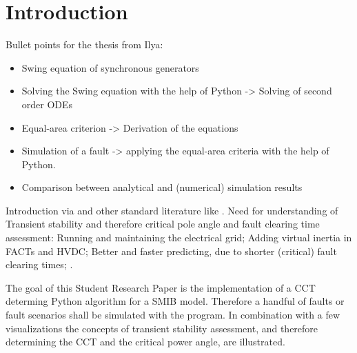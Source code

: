 
\chapter{Introduction}
\label{chap:intro}

Bullet points for the thesis from Ilya:
\begin{itemize}
    \item Swing equation of synchronous generators
    \item Solving the Swing equation with the help of Python -> Solving of second order ODEs
    \item Equal-area criterion -> Derivation of the equations
    \item Simulation of a fault -> applying the equal-area criteria with the help of Python.
    \item Comparison between analytical and (numerical) simulation results
\end{itemize}

Introduction via \autocite{vdeverbandderelektrotechnikelektronikinformationstechnike.v.PerspektivenElektrischenEnergieubertragung2019} and other standard literature like \autocite{gloverPowerSystemAnalysis2017,kundurPowerSystemStability2022,machowskiPowerSystemDynamics2020,oedingElektrischeKraftwerkeUnd2016,schwabElektroenergiesystemeSmarteStromversorgung2022}. Need for understanding of Transient stability and therefore critical pole angle and fault clearing time assessment: Running and maintaining the electrical grid; Adding virtual inertia in FACTs and HVDC; Better and faster predicting, due to shorter (critical) fault clearing times; .


The goal of this Student Research Paper is the implementation of a \ac{CCT} determing Python algorithm for a \ac{SMIB} model. Therefore a handful of faults or fault scenarios shall be simulated with the program. In combination with a few visualizations the concepts of transient stability assessment, and therefore determining the \ac{CCT} and the critical power angle, are illustrated.

%     
